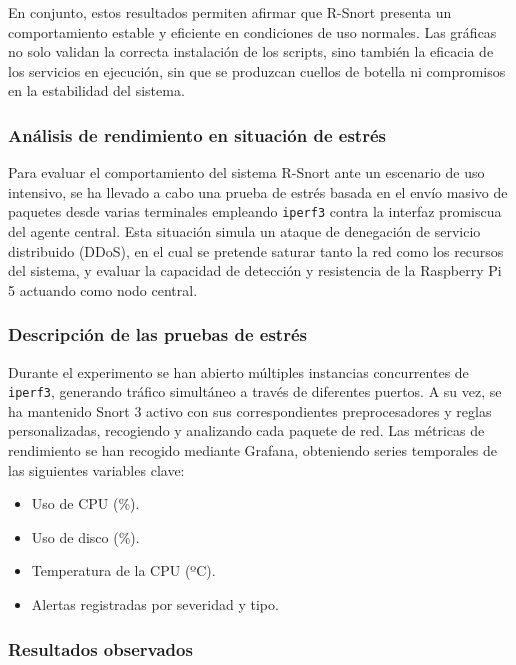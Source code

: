 \documentclass[11pt,a4paper,twoside]{report}
\begin{document}
En conjunto, estos resultados permiten afirmar que R-Snort presenta un comportamiento estable y eficiente en condiciones de uso normales. Las gráficas no solo validan la correcta instalación de los scripts, sino también la eficacia de los servicios en ejecución, sin que se produzcan cuellos de botella ni compromisos en la estabilidad del sistema.

\subsubsection{Análisis de rendimiento en situación de estrés}

Para evaluar el comportamiento del sistema R-Snort ante un escenario de uso intensivo, se ha llevado a cabo una prueba de estrés basada en el envío masivo de paquetes desde varias terminales empleando \texttt{iperf3} contra la interfaz promiscua del agente central. Esta situación simula un ataque de denegación de servicio distribuido (DDoS), en el cual se pretende saturar tanto la red como los recursos del sistema, y evaluar la capacidad de detección y resistencia de la Raspberry Pi 5 actuando como nodo central.

\subsubsection*{Descripción de las pruebas de estrés}
Durante el experimento se han abierto múltiples instancias concurrentes de \texttt{iperf3}, generando tráfico simultáneo a través de diferentes puertos. A su vez, se ha mantenido Snort 3 activo con sus correspondientes preprocesadores y reglas personalizadas, recogiendo y analizando cada paquete de red. Las métricas de rendimiento se han recogido mediante Grafana, obteniendo series temporales de las siguientes variables clave:

\begin{itemize}
	\item Uso de CPU (\%).
	\item Uso de disco (\%).
	\item Temperatura de la CPU (ºC).
	\item Alertas registradas por severidad y tipo.
\end{itemize}

\subsubsection*{Resultados observados}
\end{document}
